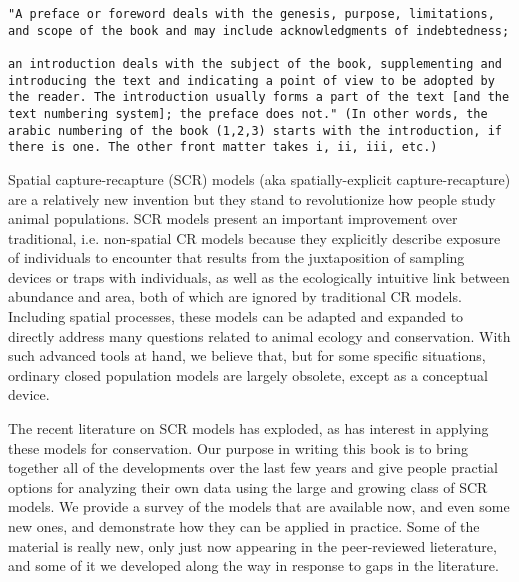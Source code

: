 \begin{verbatim}
"A preface or foreword deals with the genesis, purpose, limitations,
and scope of the book and may include acknowledgments of indebtedness;

an introduction deals with the subject of the book, supplementing and
introducing the text and indicating a point of view to be adopted by
the reader. The introduction usually forms a part of the text [and the
text numbering system]; the preface does not." (In other words, the
arabic numbering of the book (1,2,3) starts with the introduction, if
there is one. The other front matter takes i, ii, iii, etc.)
\end{verbatim}


Spatial capture-recapture (SCR) models (aka spatially-explicit
capture-recapture) are a relatively new invention but they stand to
revolutionize how people study animal populations.  SCR models present
an important improvement over traditional, i.e. non-spatial CR models
because they explicitly describe exposure of individuals to encounter
that results from the juxtaposition of sampling devices or traps with
individuals, as well as the ecologically intuitive link between
abundance and area, both of which are ignored by traditional CR
models. Including spatial processes, these models can be adapted and
expanded to directly address many questions related to animal ecology
and conservation. With such advanced tools at hand, we believe that,
but for some specific situations, ordinary closed population models
are largely obsolete, %
except as a conceptual device.

The recent literature on SCR models has exploded, %
as has interest in applying these models for conservation.
Our purpose in writing this
book is to bring together all of the developments over the last few
years and give people practial options for analyzing their own data
using the large and growing class of SCR models.  We provide a survey
of the models that are available now, and even some new ones, and
demonstrate how they can be applied in practice. Some of the material
is really new, only just now appearing in the peer-reviewed
lieterature, and some of it we developed along the way in response to
gaps in the literature.

